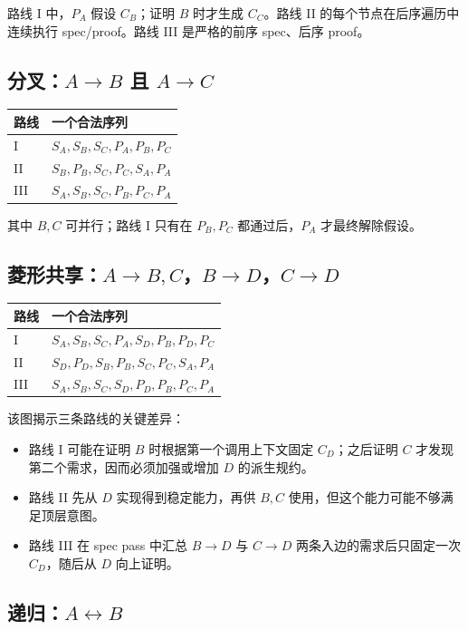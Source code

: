 \documentclass[UTF8,a4paper,11pt]{ctexart}
\begin{document}
路线 I 中，$P_A$ 假设 $C_B$；证明 $B$ 时才生成 $C_C$。路线 II 的每个节点在后序遍历中连续执行 spec/proof。路线 III 是严格的前序 spec、后序 proof。

\subsection{分叉：$A\to B$ 且 $A\to C$}

\begin{center}
\begin{tabular}{ll}
\toprule
路线 & 一个合法序列\\
\midrule
I & $S_A,S_B,S_C,P_A,P_B,P_C$\\
II & $S_B,P_B,S_C,P_C,S_A,P_A$\\
III & $S_A,S_B,S_C,P_B,P_C,P_A$\\
\bottomrule
\end{tabular}
\end{center}
其中 $B,C$ 可并行；路线 I 只有在 $P_B,P_C$ 都通过后，$P_A$ 才最终解除假设。

\subsection{菱形共享：$A\to B,C$，$B\to D$，$C\to D$}

\begin{center}
\begin{tabular}{ll}
\toprule
路线 & 一个合法序列\\
\midrule
I & $S_A,S_B,S_C,P_A,S_D,P_B,P_D,P_C$\\
II & $S_D,P_D,S_B,P_B,S_C,P_C,S_A,P_A$\\
III & $S_A,S_B,S_C,S_D,P_D,P_B,P_C,P_A$\\
\bottomrule
\end{tabular}
\end{center}

该图揭示三条路线的关键差异：
\begin{itemize}
  \item 路线 I 可能在证明 $B$ 时根据第一个调用上下文固定 $C_D$；之后证明 $C$ 才发现第二个需求，因而必须加强或增加 $D$ 的派生规约。
  \item 路线 II 先从 $D$ 实现得到稳定能力，再供 $B,C$ 使用，但这个能力可能不够满足顶层意图。
  \item 路线 III 在 spec pass 中汇总 $B\to D$ 与 $C\to D$ 两条入边的需求后只固定一次 $C_D$，随后从 $D$ 向上证明。
\end{itemize}

\subsection{递归：$A\leftrightarrow B$}
\end{document}
